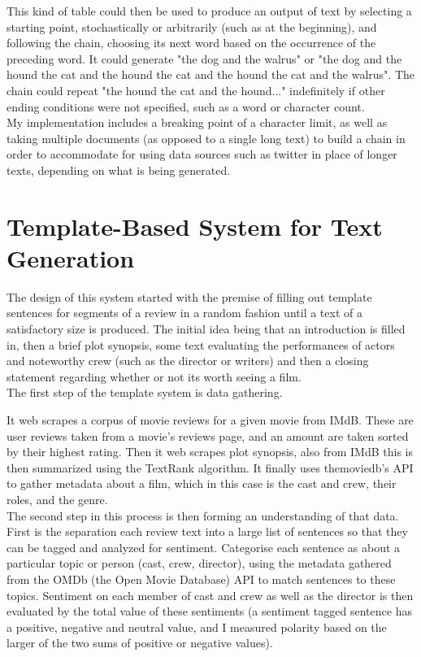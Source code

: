 This kind of table could then be used to produce an output of text by selecting a starting point, stochastically or arbitrarily (such as at the beginning), and following the chain, choosing its next word based on the occurrence of the preceding word.
It could generate "the dog and the walrus" or "the dog and the hound the cat and the hound the cat and the hound the cat and the walrus". The chain could repeat "the hound the cat and the hound..." indefinitely if other ending conditions were not specified, such as a word or character count.\\

My implementation includes a breaking point of a character limit, as well as taking multiple documents (as opposed to a single long text) to build a chain in order to accommodate for using data sources such as twitter in place of longer texts, depending on what is being generated.\\






\section{Template-Based System for Text Generation}
The design of this system started with the premise of filling out template sentences for segments of a review in a random fashion until a text of a satisfactory size is produced. The initial idea being that an introduction is filled in, then a brief plot synopsis, some text evaluating the performances of actors and noteworthy crew (such as the director or writers) and then a closing statement regarding whether or not its worth seeing a film.\\

The first step of the template system is data gathering.

It web scrapes a corpus of movie reviews for a given movie from IMdB. These are user reviews taken from a movie's reviews page, and an amount are taken sorted by their highest rating. Then it web scrapes plot synopsis, also from IMdB this is then summarized using the TextRank algorithm. It finally uses themoviedb's API to gather metadata about a film, which in this case is the cast and crew, their roles, and the genre.\\


The second step in this process is then forming an understanding of that data.
First is the separation each review text into a large list of sentences so that they can be tagged and analyzed for sentiment.
Categorise each sentence as about a particular topic or person (cast, crew, director), using the metadata gathered from the OMDb (the Open Movie Database) API to match sentences to these topics. Sentiment on each member of cast and crew as well as the director is then evaluated by the total value of these sentiments (a sentiment tagged sentence has a positive, negative and neutral value, and I measured polarity based on the larger of the two sums of positive or negative values).\\

